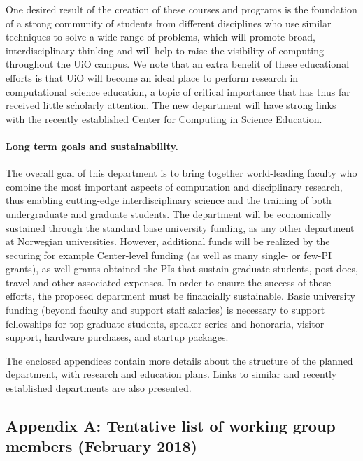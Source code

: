 \documentclass[%
oneside,                 %
final,                   %
10pt]{article}
\begin{document}
One desired result of the creation of these
courses and programs is the foundation of a strong community of students from different
disciplines who use similar techniques to solve a wide range of problems, which will promote
broad, interdisciplinary thinking and will help to raise the visibility of computing throughout the UiO campus. We note that an extra benefit of these educational
efforts is that UiO will become an ideal place to perform research in computational science
education, a topic of critical importance that has thus far received little scholarly attention. The new department will have strong links with the recently established Center for Computing in Science Education. 




\paragraph{Long term goals and sustainability.}
The overall goal of this department is to bring together world-leading
faculty who combine the most important aspects of computation and
disciplinary research, thus enabling cutting-edge interdisciplinary
science and the training of both undergraduate and graduate
students. The department will be economically sustained through the standard base
university funding, as any other department at Norwegian universities. 
However, additional funds will be
realized by the securing for example Center-level funding (as well as many
single- or few-PI grants), as well grants obtained the PIs that sustain graduate
students, post-docs, travel and other associated expenses.  In order
to ensure the success of these efforts, the proposed department must
be financially sustainable. Basic university funding (beyond faculty
and support staff salaries) is necessary to support fellowships for
top graduate students, speaker series and honoraria, visitor support,
hardware purchases, and startup packages.

The enclosed appendices contain more details about the structure of
the planned department, with research and education plans. Links to
similar and recently established departments are also presented.






\subsection*{Appendix A: Tentative list of   working group members (February 2018)}
\end{document}
